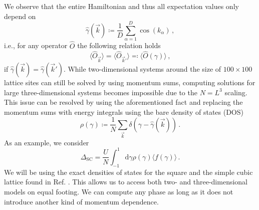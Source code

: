 \documentclass[
    reprint, 
    aps,
    preprintnumbers,
    twocolumn,
    prb,
    superscriptaddress
]{revtex4-2}
\newcommand{\vk}{\vec{k}}
\newcommand{\dgamma}{\mathrm{d}\gamma}
\newcommand{\mM}{\mathcal{M}}
\begin{document}

We observe that the entire Hamiltonian and thus all expectation values only depend on
\begin{equation}
    \hat{\gamma}(\vk) \coloneqq \frac{1}{D} \sum_{\alpha=1}^D \cos(k_\alpha)\,,
\end{equation}
i.e., for any operator $\hat{O}$ the following relation holds 
\begin{equation}
    \label{eqn:equal_expecs}
    \langle \hat{O}_{\vk} \rangle = \langle \hat{O}_{\vk'} \rangle \eqqcolon \langle \hat{O}( \gamma ) \rangle\,,
\end{equation}
if $\hat{\gamma}(\vk) = \hat{\gamma}(\vk')$.
While two-dimensional systems around the size of $100\times100$ lattice sites can still be solved by using momentum sums,
computing solutions for large three-dimensional systems becomes impossible due to the $N=L^3$ scaling.
This issue can be resolved by using the aforementioned fact and replacing the momentum sums with energy integrals using the bare density of states (DOS)
\begin{equation}
    \rho(\gamma) \coloneqq  \frac{1}{N} \sum_{\vk} \delta \left(\gamma - \hat{\gamma} (\vk) \right)\,.
\end{equation}
As an example, we consider 
\begin{equation}
    \Delta_\text{SC} = \frac{U}{N} \int_{-1}^{1} \dgamma \rho(\gamma) \langle f( \gamma ) \rangle\,.
\end{equation}
We will be using the exact densities of states for the square and the simple cubic lattice found in Ref. \cite{Hanisch97}.
This allows us to access both two- and three-dimensional models on equal footing.
We can compute any phase as long as it does not introduce another kind of momentum dependence.
\end{document}
